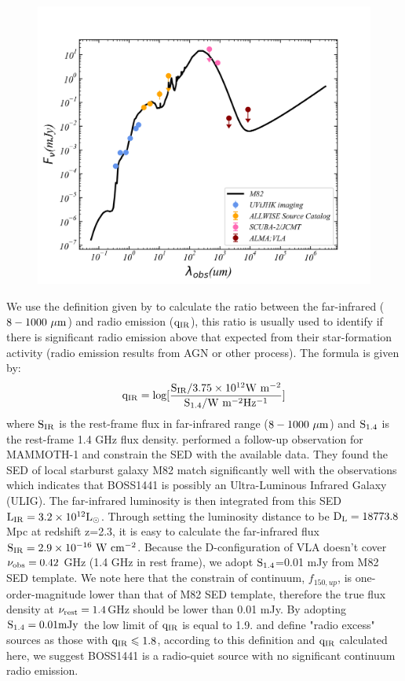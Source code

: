 	\begin{figure}[htp]
		\centering
		\includegraphics[width=\columnwidth]{figs/SED_fitting}
		\label{SED}
	\end{figure}
	
	We use the definition given by \cite{ivison2010far} to calculate the ratio between the far-infrared ($\rm 8-1000 \ \mu m$) and radio emission ($\rm q_{IR}$), this ratio is usually used to identify if there is significant radio emission above that expected from their star-formation activity (radio emission results from AGN or other process). The formula is given by:
	\begin{equation}
		\rm q_{IR}=log[\frac{S_{IR}/3.75 \times 10^{12} W \ m^{-2}}{S_{1.4}/W \ m^{-2} Hz^{-1}}]
		\label{q_IR}
	\end{equation}
	where $\rm S_{IR}$ is the rest-frame flux in far-infrared range ($8-1000 \ \rm \mu m $) and $\rm S_{1.4}$ is the rest-frame 1.4 GHz flux density. \citep{arrigoni2018overdensity} performed a follow-up observation for MAMMOTH-1 and constrain the SED with the available data. They found the SED of local starburst galaxy M82 match significantly well with the observations which indicates that BOSS1441 is possibly an Ultra-Luminous Infrared Galaxy (ULIG). The far-infrared luminosity is then integrated from this SED $\rm L_{IR}=3.2 \times 10^{12}L_{\odot}$. Through setting the luminosity distance to be $\rm D_{L}=18773.8$ Mpc at redshift z=2.3, it is easy to calculate the far-infrared flux $\rm S_{IR}=2.9 \times 10^{-16}\ W \ cm^{-2}$.  Because the D-configuration of VLA doesn't cover $\rm \nu_{obs}=0.42$ GHz (1.4 GHz in rest frame), we adopt $\rm S_{1.4}$=0.01 mJy from M82 SED template. We note here that the constrain of continuum, $f_{150,up}$, is one-order-magnitude lower than that of M82 SED template, therefore the true flux density at $\rm \nu_{rest}=1.4$GHz should be lower than 0.01 mJy. By adopting $\rm S_{1.4}=0.01 mJy$ the low limit of $\rm q_{IR}$ is equal to 1.9. \cite{ivison2010far} and \cite{del2013goods} define "radio excess" sources as those with $\rm q_{IR} \leqslant 1.8$, according to this definition and $\rm q_{IR}$ calculated here, we suggest BOSS1441 is a radio-quiet source with no significant continuum radio emission.

